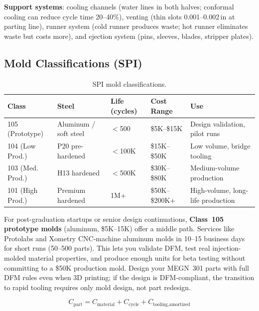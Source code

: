 \textbf{Support systems}: cooling channels (water lines in both halves; conformal cooling can reduce cycle time 20--40\%), venting (thin slots 0.001--0.002\,in at parting line), runner system (cold runner produces waste; hot runner eliminates waste but costs more), and ejection system (pins, sleeves, blades, stripper plates).

\subsection{Mold Classifications (SPI)}

\begin{table}[htbp]
\centering\small
\begin{tabularx}{\textwidth}{l l l l X}
  \toprule
  \textbf{Class} & \textbf{Steel} & \textbf{Life (cycles)} & \textbf{Cost Range} & \textbf{Use} \\
  \midrule
  105 (Prototype) & Aluminum / soft steel & $<$500 & \$5K--\$15K & Design validation, pilot runs \\
  104 (Low Prod.) & P20 pre-hardened & $<$100K & \$15K--\$50K & Low volume, bridge tooling \\
  103 (Med. Prod.) & H13 hardened & $<$500K & \$30K--\$80K & Medium-volume production \\
  101 (High Prod.) & Premium hardened & 1M+ & \$50K--\$200K+ & High-volume, long-life production \\
  \bottomrule
\end{tabularx}
\caption{SPI mold classifications.}
\end{table}

\begin{tipbox}
For post-graduation startups or senior design continuations, \textbf{Class~105 prototype molds} (aluminum, \$5K--15K) offer a middle path. Services like Protolabs and Xometry CNC-machine aluminum molds in 10--15 business days for short runs (50--500 parts). This lets you validate DFM, test real injection-molded material properties, and produce enough units for beta testing without committing to a \$50K production mold. Design your MEGN~301 parts with full DFM rules even when 3D printing; if the design is DFM-compliant, the transition to rapid tooling requires only mold design, not part redesign.
\end{tipbox}

\begin{equation}
  C_{\text{part}} = C_{\text{material}} + C_{\text{cycle}} + C_{\text{tooling,amortized}}
\end{equation}

